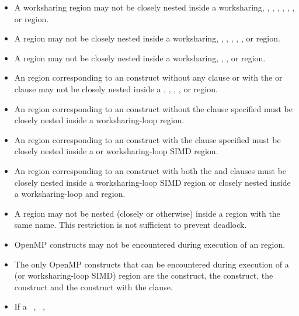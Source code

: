 \begin{itemize}
\item A worksharing region may not be closely nested inside a worksharing,
      , , , , ,
      , or  region.
\item A  region may not be closely nested inside a worksharing,
      , , , ,
      , or  region.
\item A  region may not be closely nested inside a worksharing,
      , , or  region.
\item An  region corresponding to an  construct
      without any clause or with the  or  clause 
      may not be closely nested inside a , , 
      , , or  region.
\item An  region corresponding to an  construct 
      without the  clause specified must be closely nested inside 
      a worksharing-loop region.
\item An  region corresponding to an  construct 
      with the  clause specified must be closely nested inside a 
       or worksharing-loop SIMD region.
\item An  region corresponding to an  construct 
      with both the  and  clauses must be closely 
      nested inside a worksharing-loop SIMD region or closely nested inside 
      a worksharing-loop and  region.
\item A  region may not be nested (closely or otherwise) inside 
      a  region with the same name. This restriction is not 
      sufficient to prevent deadlock.
\item OpenMP constructs may not be encountered during execution of an
       region.
\item The only OpenMP constructs that can be encountered during execution of a
       (or worksharing-loop SIMD) region are the  construct,
      the  construct, the  construct and the  
      construct with the  clause.
\item If a ~, ~,

\end{itemize}
